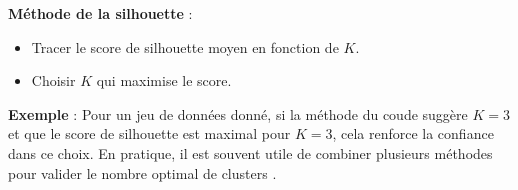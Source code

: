 \documentclass[10pt,a4paper]{article}
\begin{document}
\textbf{Méthode de la silhouette} :
\begin{itemize}
    \item Tracer le score de silhouette moyen en fonction de $K$.
    \item Choisir $K$ qui maximise le score.
\end{itemize}

\textbf{Exemple} :
Pour un jeu de données donné, si la méthode du coude suggère $K=3$ et que le score de silhouette est maximal pour $K=3$, cela renforce la confiance dans ce choix. En pratique, il est souvent utile de combiner plusieurs méthodes pour valider le nombre optimal de clusters \cite{elbow-silhouette-datacamp, elbow-silhouette-kdnuggets}.
\end{document}
